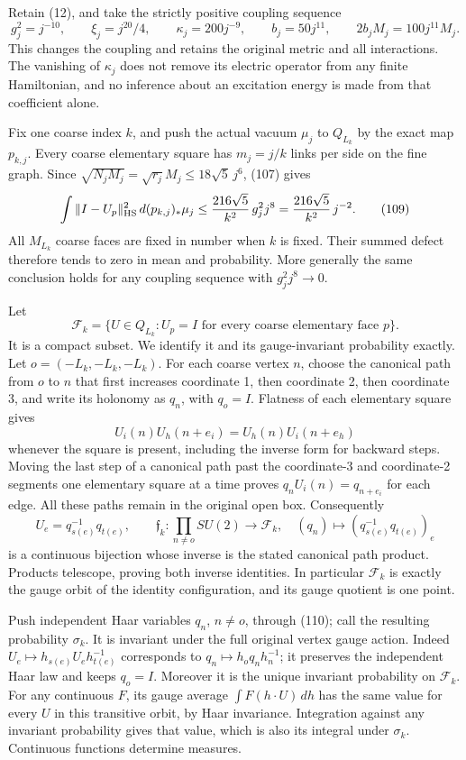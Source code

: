 \documentclass[
  11pt,
]{article}
\begin{document}
Retain (12), and take the strictly positive coupling sequence \[
 g_j^2=j^{-10},\qquad
 \xi_j=j^{20}/4,\qquad
 \kappa_j=200j^{-9},\qquad
 b_j=50j^{11},\qquad
 2b_jM_j=100j^{11}M_j .
 \tag{108}
\] This changes the coupling and retains the original metric and all
interactions. The vanishing of \(\kappa_j\) does not remove its electric
operator from any finite Hamiltonian, and no inference about an
excitation energy is made from that coefficient alone.

Fix one coarse index \(k\), and push the actual vacuum \(\mu_j\) to
\(Q_{L_k}\) by the exact map \(p_{k,j}\). Every coarse elementary square
has \(m_j=j/k\) links per side on the fine graph. Since
\(\sqrt{N_jM_j}=\sqrt{r_j}M_j\le18\sqrt5\,j^6\), (107) gives \[
 \int\|I-U_p\|_{\rm HS}^2\,d(p_{k,j})_*\mu_j
 \le\frac{216\sqrt5}{k^2}\,g_j^2j^8
 =\frac{216\sqrt5}{k^2}\,j^{-2}.
 \tag{109}
\] All \(M_{L_k}\) coarse faces are fixed in number when \(k\) is fixed.
Their summed defect therefore tends to zero in mean and probability.
More generally the same conclusion holds for any coupling sequence with
\(g_j^2j^8\to0\).

Let \[
 \mathcal F_k=\{U\in Q_{L_k}: U_p=I
                     \text{ for every coarse elementary face }p\}.
\] It is a compact subset. We identify it and its gauge-invariant
probability exactly. Let \(o=(-L_k,-L_k,-L_k)\). For each coarse vertex
\(n\), choose the canonical path from \(o\) to \(n\) that first
increases coordinate 1, then coordinate 2, then coordinate 3, and write
its holonomy as \(q_n\), with \(q_o=I\). Flatness of each elementary
square gives \[
 U_i(n)U_h(n+e_i)=U_h(n)U_i(n+e_h)
\] whenever the square is present, including the inverse form for
backward steps. Moving the last step of a canonical path past the
coordinate-3 and coordinate-2 segments one elementary square at a time
proves \(q_nU_i(n)=q_{n+e_i}\) for each edge. All these paths remain in
the original open box. Consequently \[
 U_e=q_{s(e)}^{-1}q_{t(e)},\qquad
 \mathfrak f_k:
 \prod_{n\ne o}SU(2)\longrightarrow\mathcal F_k,\quad
 (q_n)\longmapsto(q_{s(e)}^{-1}q_{t(e)})_e
 \tag{110}
\] is a continuous bijection whose inverse is the stated canonical path
product. Products telescope, proving both inverse identities. In
particular \(\mathcal F_k\) is exactly the gauge orbit of the identity
configuration, and its gauge quotient is one point.

Push independent Haar variables \(q_n\), \(n\ne o\), through (110); call
the resulting probability \(\sigma_k\). It is invariant under the full
original vertex gauge action. Indeed
\(U_e\mapsto h_{s(e)}U_eh_{t(e)}^{-1}\) corresponds to
\(q_n\mapsto h_o q_nh_n^{-1}\); it preserves the independent Haar law
and keeps \(q_o=I\). Moreover it is the unique invariant probability on
\(\mathcal F_k\). For any continuous \(F\), its gauge average
\(\int F(h\cdot U)\,dh\) has the same value for every \(U\) in this
transitive orbit, by Haar invariance. Integration against any invariant
probability gives that value, which is also its integral under
\(\sigma_k\). Continuous functions determine measures.
\end{document}
